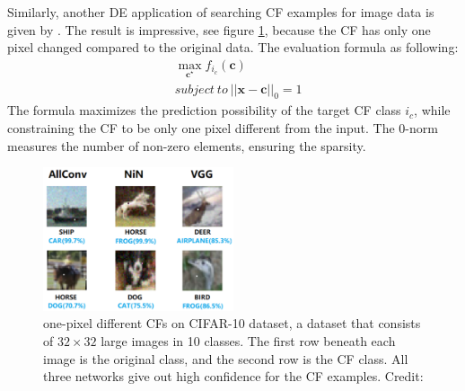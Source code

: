 Similarly, another DE application of searching CF examples for image data is given by \citeauthor{onePixel} \cite{onePixel}. The result is impressive, see figure \ref{fig:onepixel}, because the CF has only one pixel changed compared to the original data. The evaluation formula as following:
\begin{equation}\label{eq:onepixel}
  \begin{split}
     &\max_{\mathbf c^\star} f_{i_c}(\mathbf{c})\\
     &subject\ to\ ||\mathbf{x-c}||_0=1
  \end{split}
\end{equation}
The formula maximizes the prediction possibility of the target CF class $i_c$, while constraining the CF to be only one pixel different from the input. The 0-norm measures the number of non-zero elements, ensuring the sparsity.
\begin{figure}
  \centering
  \includegraphics[width=0.5\textwidth]{onepixel.PNG}
  \caption{one-pixel different CFs on CIFAR-10 dataset, a dataset that consists of $32\times32$ large images in 10 classes.
  The first row beneath each image is the original class, and the second row is the CF class. All three networks give out high confidence for the CF examples. Credit: \cite{onePixel}
  }
  \label{fig:onepixel}
\end{figure}

